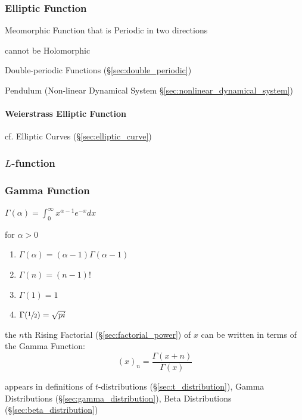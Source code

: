 \subsubsection{Elliptic Function}\label{sec:elliptic_function}

Meomorphic Function that is Periodic in two directions

cannot be Holomorphic

Double-periodic Functions (\S\ref{sec:double_periodic})

Pendulum (Non-linear Dynamical System \S\ref{sec:nonlinear_dynamical_system})



\paragraph{Weierstrass Elliptic Function}\label{sec:weierstrass_elliptic}\hfill

cf. Elliptic Curves (\S\ref{sec:elliptic_curve})



\subsubsection{$L$-function}\label{sec:l_function}

\subsubsection{Gamma Function}\label{sec:gamma_function}

$\Gamma(\alpha) = \int_0^{\infty} x^{\alpha -1} e^{-x} dx$

for $\alpha > 0$

\begin{enumerate}
\item $\Gamma(\alpha) = (\alpha - 1) \Gamma(\alpha -1)$
\item $\Gamma(n) = (n-1)!$
\item $\Gamma(1) = 1$
\item $\Gamma(\sfrac{1}{2}) = \sqrt{pi}$
\end{enumerate}

the $n$th Rising Factorial (\S\ref{sec:factorial_power}) of $x$ can be written
in terms of the Gamma Function:
\[
  (x)_n = \frac{\Gamma(x+n)}{\Gamma(x)}
\]

appears in definitions of $t$-distributions (\S\ref{sec:t_distribution}), Gamma
Distributions (\S\ref{sec:gamma_distribution}), Beta Distributions
(\S\ref{sec:beta_distribution})

